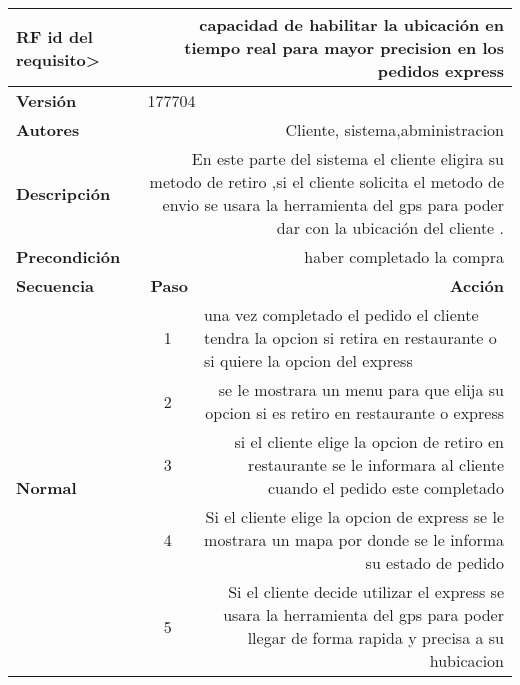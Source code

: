 \documentclass[conference]{IEEEtran}
\begin{document}
\begin{table}[H]
  \centering
   \begin{adjustbox}{width=0.47\textwidth}
    \begin{tabular}{|p{11.215em}|r|r|}
    \toprule
    \textbf{RF id del requisito>} & \multicolumn{2}{p{37.355em}|}{\textbf{capacidad de habilitar la ubicación en tiempo real para mayor precision en los pedidos express }} \\
    \midrule
    \textbf{Versión} & \multicolumn{2}{l|}{177704} \\
    \midrule
    \textbf{Autores} & \multicolumn{2}{p{37.355em}|}{Cliente, sistema,abministracion } \\
    \midrule
    \textbf{Descripción} & \multicolumn{2}{p{37.355em}|}{En este parte del sistema el cliente eligira su metodo de retiro ,si el cliente solicita el metodo de envio  se usara la herramienta del gps para poder dar con la ubicación del cliente . } \\
    \midrule
    \textbf{Precondición} & \multicolumn{2}{p{37.355em}|}{haber completado la compra } \\
    \midrule
    \textbf{Secuencia} & \multicolumn{1}{p{5.355em}|}{\textbf{Paso}} & \multicolumn{1}{p{32em}|}{\textbf{Acción}} \\
    \midrule
    \multirow{7}[12]{*}{\textbf{Normal}} & \multicolumn{1}{c|}{\multirow{2}[2]{*}{1}} & \multicolumn{1}{l|}{\multirow{2}[2]{*}{una vez completado el pedido el cliente tendra la opcion si  retira en restaurante o si quiere la opcion del express }} \\
    \multicolumn{1}{|c|}{} &       &  \\
\cmidrule{2-3}    \multicolumn{1}{|c|}{} & \multicolumn{1}{c|}{2} & \multicolumn{1}{p{32em}|}{se le mostrara un menu para que elija su opcion si es retiro en restaurante o express} \\
\cmidrule{2-3}    \multicolumn{1}{|c|}{} & \multicolumn{1}{c|}{3} & \multicolumn{1}{p{32em}|}{si el cliente elige la opcion de retiro en restaurante se le informara al cliente cuando el pedido este completado } \\
\cmidrule{2-3}    \multicolumn{1}{|c|}{} & \multicolumn{1}{c|}{4} & \multicolumn{1}{p{32em}|}{Si el cliente elige la opcion de express se le mostrara un mapa por donde se le informa su estado de pedido } \\
\cmidrule{2-3}    \multicolumn{1}{|c|}{} & \multicolumn{1}{c|}{5} & \multicolumn{1}{p{32em}|}{Si el cliente decide utilizar el express se usara la herramienta del gps para poder llegar de forma rapida y precisa a su hubicacion } \\

\end{tabular}
\end{adjustbox}
\end{table}
\end{document}
